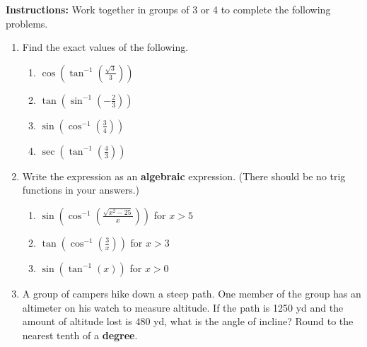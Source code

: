 


\noindent \textbf{Instructions:}  Work together in groups of  3 or 4 to complete the following problems.\\

\begin{enumerate}

\item Find the exact values of the following.
\begin{enumerate}

\item $\cos \left( \tan^{-1}(\frac{\sqrt{3}}{3})\right)$

\vfill
\item $\tan \left( \sin^{-1}(-\frac{2}{3})\right)$


\vfill

\item $\sin \left( \cos^{-1}(\frac{3}{4})\right)$
\vfill

\item $\sec \left( \tan^{-1}(\frac{4}{3})\right)$
\vfill

\end{enumerate}



\newpage
\item Write the expression as an \textbf{algebraic} expression.  (There should be no trig functions in your answers.)

\begin{enumerate}

\item $\displaystyle \sin \left( \cos^{-1}\left(\frac{\sqrt{x^2-25}}{x}\right)\right)$ for $x>5$

\vfill

\item $\displaystyle \tan \left( \cos^{-1}\left(\frac{3}{x}\right)\right)$ for $x>3$
\vfill

\item $\displaystyle \sin \left( \tan^{-1}\left(x\right)\right)$ for $x>0$
\vfill


\end{enumerate}


\newpage

\item A group of campers hike down a steep path.  One member of the group has an altimeter on his watch to measure altitude.  If the path is 1250 yd and the amount of altitude lost is 480 yd, what is the angle of incline?  Round to the nearest tenth of a \textbf{degree}.
\vfill


\end{enumerate}
